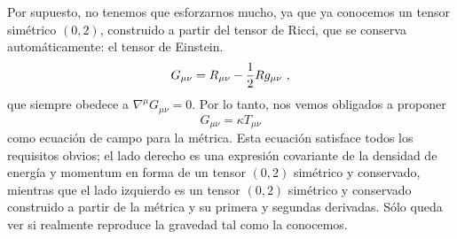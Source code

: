 \documentclass[11pt,b5paper,openany,twoside]{book}
\newcommand{\mn}{{\mu\nu}}
\begin{document}
Por supuesto, no tenemos que esforzarnos mucho, ya que ya conocemos un tensor simétrico $(0,2)$, construido a partir del tensor de Ricci, que se conserva automáticamente: el tensor de Einstein.
\begin{equation}
G_\mn = R_\mn - {1\over 2} R g_\mn\ ,\label{4.42}
\end{equation}
que siempre obedece a $\nabla^\mu G_\mn =0$.
Por lo tanto, nos vemos obligados a proponer
\begin{equation}
G_\mn = \kappa T_\mn\label{4.43}
\end{equation}
como ecuación de campo para la métrica.
Esta ecuación satisface todos los requisitos obvios; el lado derecho es una expresión covariante de la densidad de energía y momentum en forma de un tensor $(0,2)$ simétrico y conservado, mientras que el lado izquierdo es un tensor $(0,2)$ simétrico y conservado construido a partir de la métrica y su primera y segundas derivadas.
Sólo queda ver si realmente reproduce la gravedad tal como la conocemos.
\end{document}
